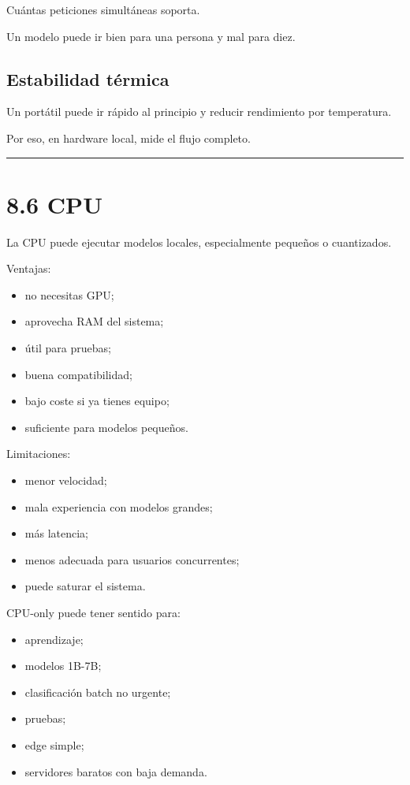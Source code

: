 Cuántas peticiones simultáneas soporta.

Un modelo puede ir bien para una persona y mal para diez.

\subsection{Estabilidad térmica}\label{estabilidad-tuxe9rmica}

Un portátil puede ir rápido al principio y reducir rendimiento por
temperatura.

Por eso, en hardware local, mide el flujo completo.

\begin{center}\rule{0.5\linewidth}{0.5pt}\end{center}

\section{8.6 CPU}\label{cpu}

La CPU puede ejecutar modelos locales, especialmente pequeños o
cuantizados.

Ventajas:

\begin{itemize}
\tightlist
\item
  no necesitas GPU;
\item
  aprovecha RAM del sistema;
\item
  útil para pruebas;
\item
  buena compatibilidad;
\item
  bajo coste si ya tienes equipo;
\item
  suficiente para modelos pequeños.
\end{itemize}

Limitaciones:

\begin{itemize}
\tightlist
\item
  menor velocidad;
\item
  mala experiencia con modelos grandes;
\item
  más latencia;
\item
  menos adecuada para usuarios concurrentes;
\item
  puede saturar el sistema.
\end{itemize}

CPU-only puede tener sentido para:

\begin{itemize}
\tightlist
\item
  aprendizaje;
\item
  modelos 1B-7B;
\item
  clasificación batch no urgente;
\item
  pruebas;
\item
  edge simple;
\item
  servidores baratos con baja demanda.
\end{itemize}

